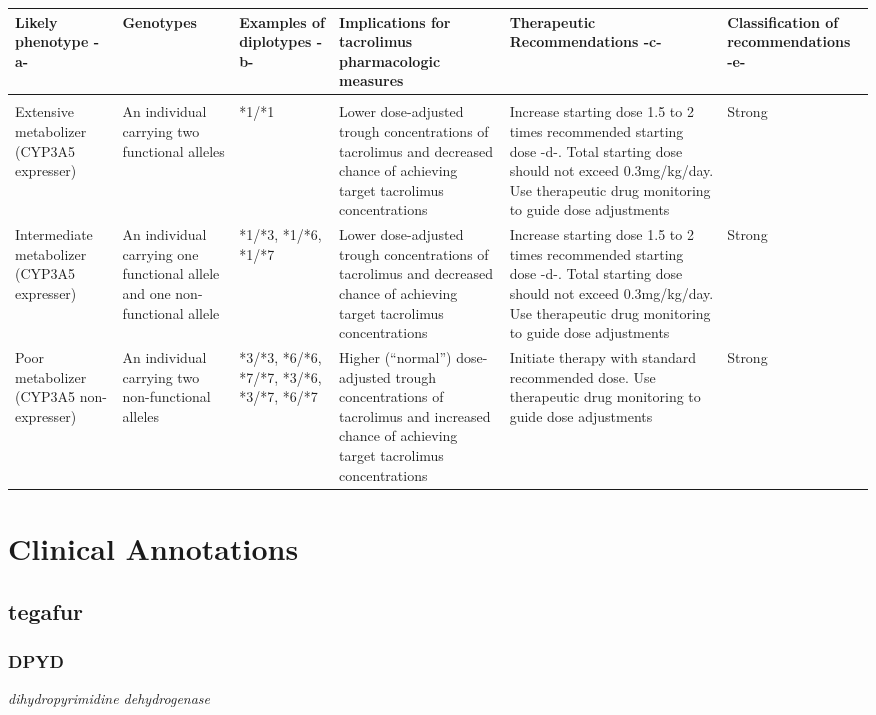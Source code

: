 \documentclass{report}
\begin{document}
      \begin{tabularx}{\textwidth}{ XXXXXX }
      \textbf{ Likely phenotype -a- }&\textbf{ Genotypes }&\textbf{ Examples of diplotypes -b- }&\textbf{ Implications for tacrolimus pharmacologic measures }&\textbf{ Therapeutic Recommendations -c- }&\textbf{ Classification of recommendations -e- } \\ \hline \\  Extensive metabolizer (CYP3A5 expresser) & An individual carrying two functional alleles & *1/*1 & Lower dose-adjusted trough concentrations of tacrolimus and decreased chance of achieving target tacrolimus concentrations & Increase starting dose 1.5 to 2 times recommended starting dose -d-. Total starting dose should not exceed 0.3mg/kg/day. Use therapeutic drug monitoring to guide dose adjustments & Strong  \\  Intermediate metabolizer (CYP3A5 expresser) & An individual carrying one functional allele and one non-functional allele & *1/*3, *1/*6, *1/*7& Lower dose-adjusted trough concentrations of tacrolimus and decreased chance of achieving target tacrolimus concentrations & Increase starting dose 1.5 to 2 times recommended starting dose -d-. Total starting dose should not exceed 0.3mg/kg/day. Use therapeutic drug monitoring to guide dose adjustments & Strong  \\  Poor metabolizer (CYP3A5 non-expresser) & An individual carrying two non-functional alleles & *3/*3, *6/*6, *7/*7, *3/*6, *3/*7, *6/*7& Higher (“normal”) dose-adjusted trough concentrations of tacrolimus and increased chance of achieving target tacrolimus concentrations & Initiate therapy with standard recommended dose. Use therapeutic drug monitoring to guide dose adjustments & Strong  \\ 
      \end{tabularx}
      
      \normalsize







\newpage

\section{Clinical Annotations}

\subsection{ tegafur }\subsubsection{ DPYD }
\textit{ dihydropyrimidine dehydrogenase } \newline
\end{document}
